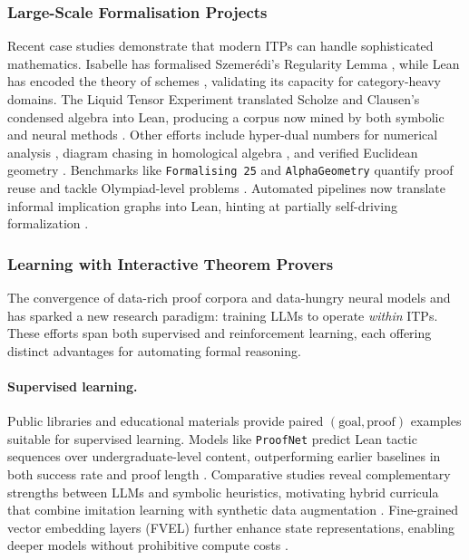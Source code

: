 \documentclass[acmsmall,anonymous]{acmart}
\begin{document}
\subsubsection{Large-Scale Formalisation Projects}\label{sec:megaprojects}
Recent case studies demonstrate that modern ITPs can handle sophisticated mathematics. Isabelle has formalised Szemerédi’s Regularity Lemma \cite{edmonds2023formalising}, while Lean has encoded the theory of schemes \cite{buzzard2022schemes,bordg2022simple}, validating its capacity for category-heavy domains. The Liquid Tensor Experiment translated Scholze and Clausen’s condensed algebra into Lean, producing a corpus now mined by both symbolic and neural methods \cite{castelvecchi2021mathematicians,scholze2022half}. Other efforts include hyper-dual numbers for numerical analysis \cite{smola2021hyperdual}, diagram chasing in homological algebra \cite{zhang2024diagramformalization}, and verified Euclidean geometry \cite{murphy2024autoformalizing}. Benchmarks like \texttt{Formalising 25} and \texttt{AlphaGeometry} quantify proof reuse and tackle Olympiad-level problems \cite{buzzard2022formalising,trinh2024alphageometry}. Automated pipelines now translate informal implication graphs into Lean, hinting at partially self-driving formalization \cite{autoformalization2023,sinha2024wusmethod}.

\subsubsection{Learning with Interactive Theorem Provers}\label{sec:learning-itp}
The convergence of data-rich proof corpora and data-hungry neural models and has sparked a new research paradigm: training LLMs to operate \emph{within} ITPs. These efforts span both supervised and reinforcement learning, each offering distinct advantages for automating formal reasoning.  

\paragraph{Supervised learning.}  Public libraries and educational materials provide paired $(\text{goal},\text{proof})$ examples suitable for supervised learning.  Models like \texttt{ProofNet} predict Lean tactic sequences over undergraduate-level content, outperforming earlier baselines in both success rate and proof length \cite{azerbayev2023proofnet}.  Comparative studies reveal complementary strengths between LLMs and symbolic heuristics, motivating hybrid curricula that combine imitation learning with synthetic data augmentation \cite{johnson2024llmvsitp}.  Fine-grained vector embedding layers (FVEL) further enhance state representations, enabling deeper models without prohibitive compute costs \cite{song2024fvel}.
\end{document}
